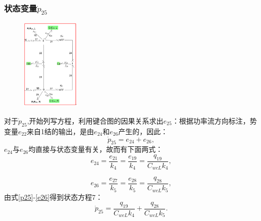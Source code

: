 \subsubsection{状态变量$\dot{ p}_{25} $}
\begin{figure}[H]
	\centering
	\includegraphics[width=0.25\textwidth]{fig/equation6.png}
	\caption{}\label{fig:equation6}
\end{figure}
对于$\dot{p} _ { 25 }$,开始列写方程，利用键合图的因果关系求出$e_{25}$：根据功率流方向标注，势变量$e_{22}$来自1结的输出，是由$e_{24}$和$e_{26}$产生的，因此：
\begin{equation}\label{p25}
\dot{ p } _ { 25 } = e _ { 24 } + e _ { 26 },
\end{equation}
$e_{24}$与$e_{26}$均直接与状态变量有关，故而有下面两式：
\begin{equation}
e _ { 24 } = \frac { e _ { 21 } } { k _ { 4 } } = \frac { e _ { 19 } } { k _ { 4 } } = \frac { q _ { 19 } } { C _ { w cL}  k _ { 4 } },
\end{equation}

\begin{equation}\label{e26}
e _ { 26 } = \frac { e _ { 27 } } { k _ { 5 } } = \frac { e _ { 28 } } { k _ { 5 } } = \frac { q _ { 28 } } { C _ { w c L }  k _ { 5 } },
\end{equation}
由式\ref{p25}-\ref{e26}得到状态方程7：
\begin{equation}
\dot{ p } _ { 25 } = \frac { q _ { 19 } } { C _ { w c L}  k _ { 4 } } + \frac { q _ { 28 } } { C _ { w cL }  k _ { 5 } }.
\end{equation}
